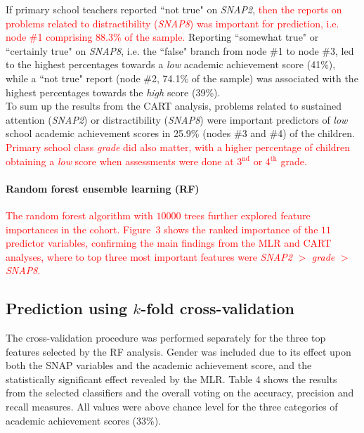 \documentclass[10pt,letterpaper]{article}
\begin{document}
{{%
 
If primary school teachers reported ``not true" on {\it SNAP2},  \textcolor{red}{then the reports on problems related to distractibility ({\it SNAP8}) was important for prediction, 
i.e. node \#1 comprising 88.3\% of the sample.} 
Reporting ``somewhat true" or ``certainly true"  on {\it SNAP8}, i.e. the ``false" branch from node \#1 to node \#3, led to the highest percentages towards a {\it low} 
academic achievement score (41\%), while a ``not true" report (node \#2, 74.1\% of the sample) was associated with the highest percentages towards the {\it high} score (39\%). \\
	
To sum up the results from the CART analysis, problems related to sustained attention ({\it SNAP2}) or distractibility ({\it SNAP8}) were important predictors of {\it low} school 
academic achievement scores in  25.9\% (nodes \#3 and \#4) of the children.  \textcolor{red}{Primary school class {\it grade} did also matter, with a higher percentage of children 
obtaining a {\it low} score when assessments were done at 3$^{\text{nd}}$ or 4$^{\text{th}}$ grade.}  \\ 

\paragraph{Random forest ensemble learning (RF)}
\textcolor{red}{The random forest algorithm with $10000$ trees further explored feature importances in the cohort. 
Figure~3 shows the ranked importance of the $11$ predictor variables, 
confirming the main findings from the MLR and CART analyses, where to top three most important features were {\it SNAP2}  $>$ {\it grade}  $>$  {\it SNAP8}.}  \\


\subsection*{Prediction using $k$-fold cross-validation}

The cross-validation procedure was performed separately for the three top features selected by the RF analysis. Gender was included due to its effect upon both the SNAP variables and the academic achievement score, and the statistically significant effect revealed by the MLR.  
Table 4 shows the results from the selected classifiers and the overall voting on the accuracy, precision and recall measures. All values were above chance level for the three categories of academic achievement scores (33\%). 



}}
\end{document}
